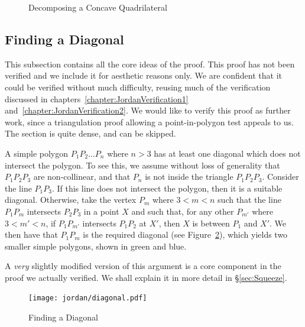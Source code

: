 \begin{figure}
  \centering 

  \caption{Decomposing a Concave Quadrilateral}
  \label{fig:quadDecompose}
\end{figure}

\subsection{Finding a Diagonal}\label{sec:FindingDiagonal}
This subsection contains all the core ideas of the proof. This proof has not been verified and we include it for aesthetic reasons only. We are confident that it could be verified without much difficulty, reusing much of the verification discussed in chapters~\ref{chapter:JordanVerification1} and~\ref{chapter:JordanVerification2}. We would like to verify this proof as further work, since a triangulation proof allowing a point-in-polygon test appeals to us. The section is quite dense, and can be skipped.

A simple polygon $P_1P_2 \ldots P_n$ where $n>3$ has at least one diagonal which does not intersect the polygon. To see this, we assume without loss of generality that $P_1P_2P_3$ are non-collinear, and that $P_n$ is not inside the triangle $P_1P_2P_3$. Consider the line $P_1P_3$. If this line does not intersect the polygon, then it is a suitable diagonal. Otherwise, take the vertex $P_m$ where $3 < m < n$ such that the line $P_1P_m$ intersects $P_2P_3$ in a point $X$ and such that, for any other $P_{m'}$ where $3 < m' < n$, if $P_1P_{m'}$ intersects $P_1P_2$ at $X'$, then $X$ is between $P_1$ and $X'$. We then have that $P_1P_m$ is the required diagonal (see Figure~\ref{fig:SqueezeDemo}), which yields two smaller simple polygons, shown in green and blue.

A \emph{very} slightly modified version of this argument is a core component in the proof we actually verified. We shall explain it in more detail in \S\ref{sec:Squeeze}.

\begin{figure}
\centering
\texttt{[image: jordan/diagonal.pdf]}
\caption{Finding a Diagonal}
\label{fig:SqueezeDemo}
\end{figure}

